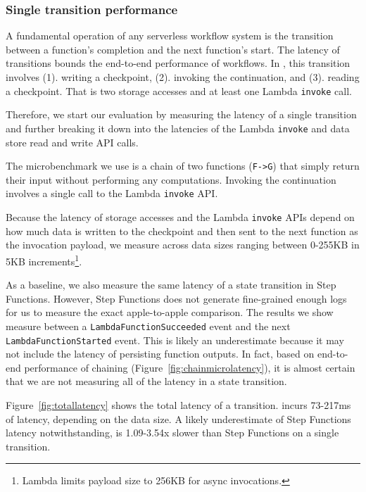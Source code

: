 
\subsubsection{Single transition performance}

A fundamental operation of any serverless workflow system is the transition
between a function's completion and the next function's start. The latency
of transitions bounds the end-to-end performance of workflows. In \name{},
this transition involves (1). writing a checkpoint, (2). invoking the
continuation, and (3). reading a checkpoint. That is two storage accesses and
at least one Lambda \texttt{invoke} call.

Therefore, we start our evaluation by measuring the latency of a single
transition and further breaking it down into the latencies of the Lambda
\texttt{invoke} and data store read and write API calls.

The microbenchmark we use is a chain of two functions (\texttt{F->G}) that
simply return their input without performing any computations. Invoking the
continuation involves a single call to the Lambda \texttt{invoke} API.

Because the latency of storage accesses and the Lambda \texttt{invoke} APIs
depend on how much data is written to the checkpoint and then sent to the next
function as the invocation payload, we measure across data sizes ranging
between 0-255KB in 5KB increments\footnote{Lambda limits payload size to 256KB
for async invocations.}.

As a baseline, we also measure the same latency of a state transition in Step
Functions. However, Step Functions does not generate fine-grained enough logs
for us to measure the exact apple-to-apple comparison. The results we show
measure between a \texttt{LambdaFunctionSucceeded} event and the next
\texttt{LambdaFunctionStarted} event. This is likely an underestimate because
it may not include the latency of persisting function outputs. In fact, based
on end-to-end performance of chaining (Figure~\ref{fig:chainmicrolatency}), it
is almost certain that we are not measuring all of the latency in a state
transition.

Figure~\ref{fig:totallatency} shows the total latency of a transition. \name{}
incurs 73-217ms of latency, depending on the data size. A likely underestimate
of Step Functions latency notwithstanding, \name{} is 1.09-3.54x slower than
Step Functions on a single transition.

